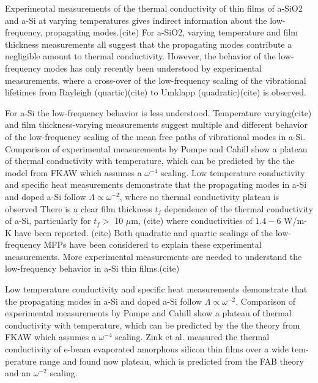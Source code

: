 \documentclass[aps,prb,onecolumn,preprint,superscriptaddress,footinbib,amsmath,amssymb,floatfix]{revtex4}
\begin{document}
Experimental measurements of the thermal conductivity of
thin films of a-SiO2 and a-Si at varying temperatures 
gives indirect information about the low-frequency, propagating 
modes.(cite) For a-SiO2, 
varying temperature 
and film thickness
\cite{lee_heat_1997,yamane_measurement_2002} 
measurements all suggest that the propagating modes 
contribute a negligible amount to thermal conductivity. 
However, the behavior of the low-frequency modes 
has only recently been understood by experimental 
measurements,
\cite{masciovecchio_evidence_2006,baldi_thermal_2008,
baldi_sound_2010,baldi_elastic_2011,baldi_emergence_2013} 
where a cross-over of the low-frequency scaling of 
the vibrational lifetimes from Rayleigh (quartic)(cite) 
to Umklapp (quadratic)(cite) is observed.

For a-Si the low-frequency behavior is less understood. Temperature 
varying(cite) and film thickness-varying measurements
\cite{hasselman_thermal_1989,wada_thermal_1996,zink_thermal_2006,
yang_anomalously_2010,cahill_thermal_1994,kuo_thermal_1992,
moon_thermal_2002,liu_high_2009}
suggest multiple and different behavior of the low-frequency 
scaling of the mean free paths of vibrational modes in a-Si. 
Comparison of experimental measurements by 
Pompe\cite{pompe_thermal_1988} and Cahill
\cite{cahill_thermal_1989,cahill_thermal_1994} show a plateau of 
thermal conductivity with temperature, 
which can be predicted by the the model from FKAW which assumes a 
$\omega^{-4}$ scaling.\cite{feldman_thermal_1993}
Low temperature conductivity and specific heat measurements demonstrate 
that the propagating modes in a-Si and doped a-Si follow 
$\Lambda \propto \omega^{-2}$,
\cite{zink_thermal_2006,zink_excess_2006} where no 
thermal conductivity plateau is observed
\cite{zink_thermal_2006,zink_excess_2006,yang_anomalously_2010} 
There is a clear film thickness $t_f$ dependence of the thermal 
conductivity of a-Si, particularly for $t_f>$ 10 $\mu$m,
(cite) where conductivities of $1.4-6$ W/m-K have been reported.
(cite) 
Both quadratic\cite{feldman_numerical_1999} 
and 
quartic\cite{feldman_thermal_1993,cahill_lower_1994,
yang_anomalously_2010} 
scalings of the low-frequency MFPs 
have been considered to explain these experimental measurements. 
More experimental measurements are needed to understand 
the low-frequency behavior in a-Si thin films.(cite) 

Low temperature conductivity and specific heat measurements demonstrate 
that the propagating modes in a-Si and doped a-Si follow 
$\Lambda \propto \omega^{-2}$.
\cite{zink_thermal_2006,zink_excess_2006} 
Comparison of experimental measurements by 
Pompe\cite{pompe_thermal_1988} and Cahill
\cite{cahill_thermal_1989,cahill_thermal_1994} show a plateau of 
thermal conductivity with temperature, 
which can be predicted by the the theory from FKAW which assumes a 
$\omega^{-4}$ scaling.\cite{feldman_thermal_1993}  
Zink et al. measured the thermal conductivity of e-beam
evaporated amorphous silicon thin films over a wide tem-
perature range and found now plateau, which is predicted from the 
FAB theory and an $\omega^{-2}$ scaling.\cite{feldman_numerical_1999}  
\end{document}

